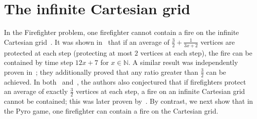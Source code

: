 \documentclass[12pt]{article}
\newcommand{\me}[1]{{\textcolor{blue}{ [\textbf{M.E..:}}\  \textcolor{blue}{{\em #1}]}}}
\begin{document}





\section{The infinite Cartesian grid} \label{sec:pyroCart}

In the Firefighter problem, one firefighter cannot contain a fire on the infinite Cartesian grid~\cite{WangMoeller}.  It was shown in~\cite{3/2} that if an average of $\tfrac{3}{2}+\tfrac{1}{3x+2}$ vertices are protected at each step (protecting at most $2$ vertices at each step), the fire can be contained by time step $12x+7$ for $x \in \mathbb{N}$.  A similar result was independently proven in~\cite{Ng}; they additionally proved that any ratio greater than $\frac{3}{2}$ can be achieved. In both~\cite{3/2} and~\cite{Ng}, the authors also conjectured that if firefighters protect an average of exactly $\tfrac{3}{2}$ vertices at each step, a fire on an infinite Cartesian grid cannot be contained; this was later proven by~\cite{Feldheim}.  By contrast, we next show that in the Pyro game, one firefighter can contain a fire on the Cartesian grid.  
\end{document}
